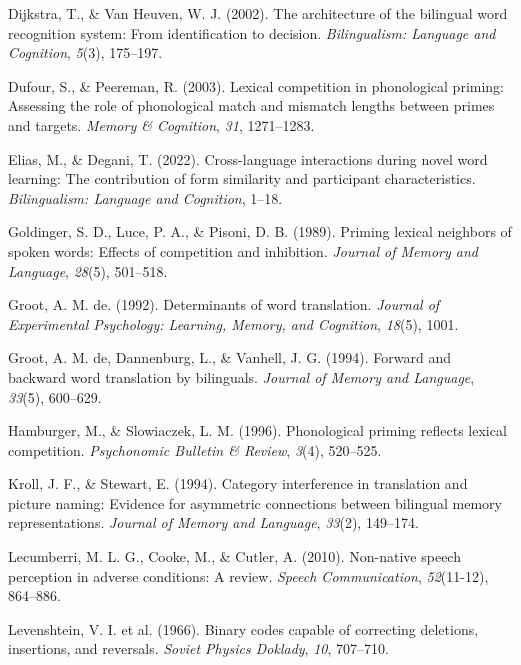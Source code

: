 \documentclass[
]{article}
\newlength{\cslhangindent}
\newenvironment{CSLReferences}[2] %
 {\begin{list}{}{%
  \setlength{\itemindent}{0pt}
  \setlength{\leftmargin}{0pt}
  \setlength{\parsep}{0pt}
  \ifodd #1
   \setlength{\leftmargin}{\cslhangindent}
   \setlength{\itemindent}{-1\cslhangindent}
  \fi
  \setlength{\itemsep}{#2\baselineskip}}}
 {\end{list}}
\begin{document}
\begin{CSLReferences}{1}{0}
Dijkstra, T., \& Van Heuven, W. J. (2002). The architecture of the
bilingual word recognition system: From identification to decision.
\emph{Bilingualism: Language and Cognition}, \emph{5}(3), 175--197.

Dufour, S., \& Peereman, R. (2003). Lexical competition in phonological
priming: Assessing the role of phonological match and mismatch lengths
between primes and targets. \emph{Memory \& Cognition}, \emph{31},
1271--1283.

Elias, M., \& Degani, T. (2022). Cross-language interactions during
novel word learning: The contribution of form similarity and participant
characteristics. \emph{Bilingualism: Language and Cognition}, 1--18.

Goldinger, S. D., Luce, P. A., \& Pisoni, D. B. (1989). Priming lexical
neighbors of spoken words: Effects of competition and inhibition.
\emph{Journal of Memory and Language}, \emph{28}(5), 501--518.

Groot, A. M. de. (1992). Determinants of word translation. \emph{Journal
of Experimental Psychology: Learning, Memory, and Cognition},
\emph{18}(5), 1001.

Groot, A. M. de, Dannenburg, L., \& Vanhell, J. G. (1994). Forward and
backward word translation by bilinguals. \emph{Journal of Memory and
Language}, \emph{33}(5), 600--629.

Hamburger, M., \& Slowiaczek, L. M. (1996). Phonological priming
reflects lexical competition. \emph{Psychonomic Bulletin \& Review},
\emph{3}(4), 520--525.

Kroll, J. F., \& Stewart, E. (1994). Category interference in
translation and picture naming: Evidence for asymmetric connections
between bilingual memory representations. \emph{Journal of Memory and
Language}, \emph{33}(2), 149--174.

Lecumberri, M. L. G., Cooke, M., \& Cutler, A. (2010). Non-native speech
perception in adverse conditions: A review. \emph{Speech Communication},
\emph{52}(11-12), 864--886.

Levenshtein, V. I. et al. (1966). Binary codes capable of correcting
deletions, insertions, and reversals. \emph{Soviet Physics Doklady},
\emph{10}, 707--710.


\end{CSLReferences}
\end{document}
